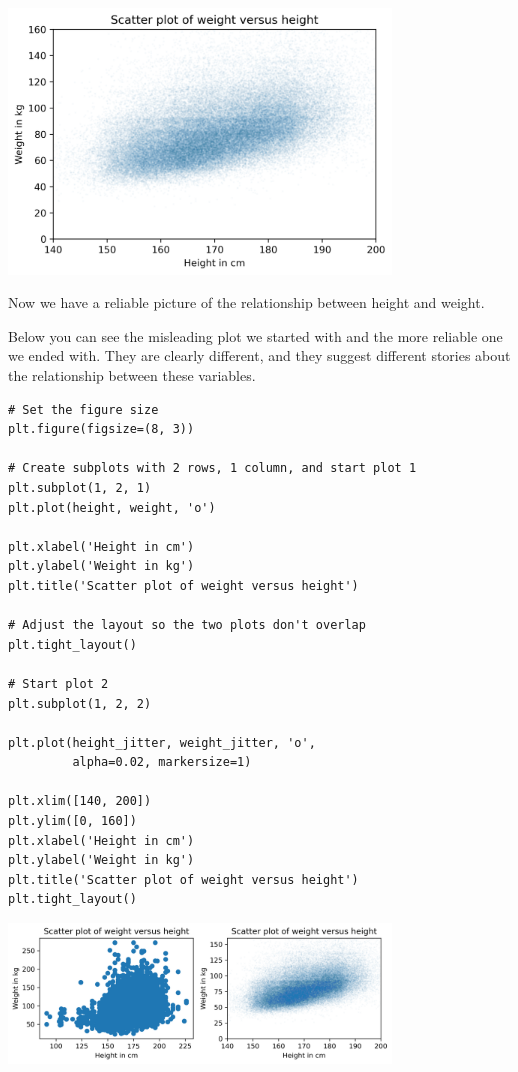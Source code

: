 \begin{center}
\includegraphics[width=4in]{09_relationships_files/09_relationships_26_0.png}
\end{center}

Now we have a reliable picture of the relationship between height and
weight.

Below you can see the misleading plot we started with and the more
reliable one we ended with. They are clearly different, and they suggest
different stories about the relationship between these variables.

\begin{lstlisting}[]
# Set the figure size
plt.figure(figsize=(8, 3))

# Create subplots with 2 rows, 1 column, and start plot 1
plt.subplot(1, 2, 1)
plt.plot(height, weight, 'o')

plt.xlabel('Height in cm')
plt.ylabel('Weight in kg')
plt.title('Scatter plot of weight versus height')

# Adjust the layout so the two plots don't overlap
plt.tight_layout()

# Start plot 2
plt.subplot(1, 2, 2)

plt.plot(height_jitter, weight_jitter, 'o', 
         alpha=0.02, markersize=1)

plt.xlim([140, 200])
plt.ylim([0, 160])
plt.xlabel('Height in cm')
plt.ylabel('Weight in kg')
plt.title('Scatter plot of weight versus height')
plt.tight_layout()
\end{lstlisting}

\begin{center}
\includegraphics[width=4in]{09_relationships_files/09_relationships_28_0.png}
\end{center}

